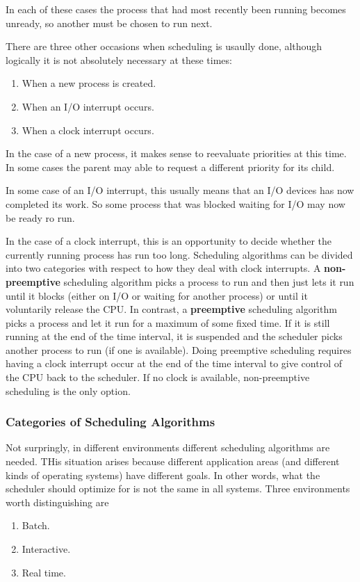 \documentclass{book}
\newcommand {\kw}  [1] {\textbf{#1}}
\begin{document}
In each of these cases the process that had most recently been running becomes unready, so another must be chosen to run next.

There are three other occasions when scheduling is usaully done, although logically it is not absolutely necessary at these times:
\begin{enumerate}
  \item When a new process is created.
  \item When an I/O interrupt occurs.
  \item When a clock interrupt occurs.
\end{enumerate}

In the case of a new process, it makes sense to reevaluate priorities at this time.
In some cases the parent may able to request a different priority for its child.

In some case of an I/O interrupt, this usually means that an I/O devices has now completed its work.
So some process that was blocked waiting for I/O may now be ready ro run.

In the case of a clock interrupt, this is an opportunity to decide whether the currently running process has run too long.
Scheduling algorithms can be divided into two categories with respect to how they deal with clock interrupts.
A \kw{non-preemptive} scheduling algorithm picks a process to run and 
then just lets it run until it blocks (either on I/O or waiting for another process)
or until it voluntarily release the CPU.
In contrast, a \kw{preemptive} scheduling algorithm picks a process and let it run for a maximum of some fixed time.
If it is still running at the end of the time interval, it is suspended and the scheduler picks another process to run (if one is available).
Doing preemptive scheduling requires having a clock interrupt occur at the end of the time interval to 
give control of the CPU back to the scheduler.
If no clock is available, non-preemptive scheduling is the only option.

\subsubsection*{Categories of Scheduling Algorithms}
Not surpringly, in different environments different scheduling algorithms are needed.
THis situation arises because different application areas (and different kinds of operating systems) have different goals.
In other words, what the scheduler should optimize for is not the same in all systems.
Three environments worth distinguishing are
\begin{enumerate}
  \item Batch.
  \item Interactive.
  \item Real time.
\end{enumerate}
\end{document}
